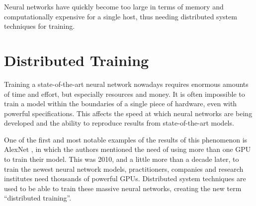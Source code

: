 Neural networks have quickly become too large in terms of memory and computationally expensive for a single host, thus needing distributed system techniques for training.

\section{Distributed Training}
Training a state-of-the-art neural network nowadays requires enormous amounts of time and effort, but especially resources and money.
It is often impossible to train a model within the boundaries of a single piece of hardware, even with powerful specifications.
This affects the speed at which neural networks are being developed and the ability to reproduce results from state-of-the-art models.

One of the first and most notable examples of the results of this phenomenon is AlexNet \cite{alexnet2012}, in which the authors mentioned the need of using more than one GPU to train their model.
This was 2010, and a little more than a decade later, to train the newest neural network models, practitioners, companies and research institutes need thousands of powerful GPUs.
Distributed system techniques are used to be able to train these massive neural networks, creating the new term ``distributed training''.

